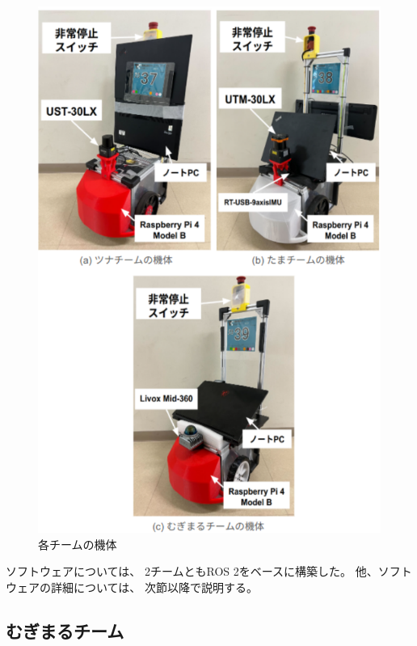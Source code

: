 \documentclass[twocolumn,9pt]{jsproceedings}
\begin{document}
\begin{figure}[htbp]
  \begin{center}
    \includegraphics[width=1.0\linewidth]{figs/robot.pdf}
    \caption{各チームの機体}
    \label{fig:robot}
  \end{center}
\end{figure}

ソフトウェアについては、
2チームともROS 2をベースに構築した。
他、ソフトウェアの詳細については、
次節以降で説明する。


\subsection{むぎまるチーム}

\end{document}
